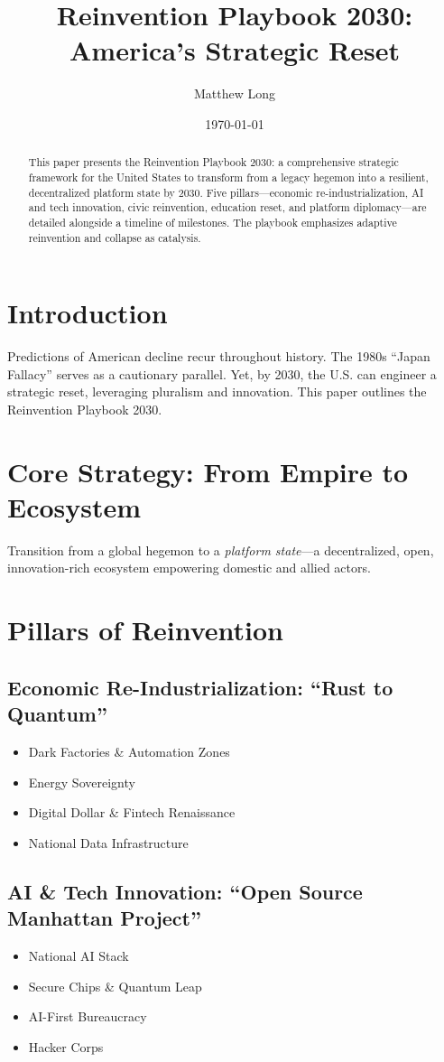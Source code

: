 \documentclass[11pt]{article}
\title{Reinvention Playbook 2030:\\America’s Strategic Reset}
\author{Matthew Long}
\date{\today}
\begin{document}
\maketitle
\begin{abstract}
This paper presents the Reinvention Playbook 2030: a comprehensive strategic framework for the United States to transform from a legacy hegemon into a resilient, decentralized platform state by 2030. Five pillars—economic re-industrialization, AI and tech innovation, civic reinvention, education reset, and platform diplomacy—are detailed alongside a timeline of milestones. The playbook emphasizes adaptive reinvention and collapse as catalysis.
\end{abstract}

\section{Introduction}
Predictions of American decline recur throughout history. The 1980s “Japan Fallacy” serves as a cautionary parallel. Yet, by 2030, the U.S. can engineer a strategic reset, leveraging pluralism and innovation. This paper outlines the Reinvention Playbook 2030.

\section{Core Strategy: From Empire to Ecosystem}
Transition from a global hegemon to a \emph{platform state}—a decentralized, open, innovation-rich ecosystem empowering domestic and allied actors.

\section{Pillars of Reinvention}
\subsection{Economic Re-Industrialization: “Rust to Quantum”}
\begin{itemize}
    \item Dark Factories \& Automation Zones
    \item Energy Sovereignty
    \item Digital Dollar \& Fintech Renaissance
    \item National Data Infrastructure
\end{itemize}

\subsection{AI \& Tech Innovation: “Open Source Manhattan Project”}
\begin{itemize}
    \item National AI Stack
    \item Secure Chips \& Quantum Leap
    \item AI-First Bureaucracy
    \item Hacker Corps
\end{itemize}
\end{document}
